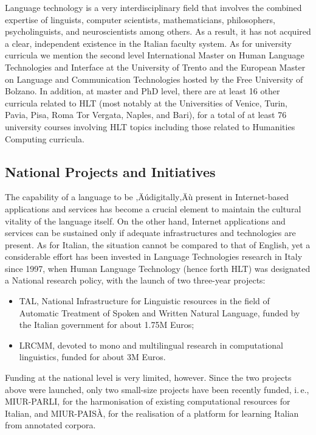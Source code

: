 \begin{multicols}{2}
Language technology is a very interdisciplinary field that involves
the combined expertise of linguists, computer scientists,
mathematicians, philosophers, psycholinguists, and neuroscientists
among others. As a result, it has not acquired a clear, independent
existence in the Italian faculty system. As for university curricula we mention the second level International Master
on Human Language Technologies and Interface at the University of Trento and
the European Master on Language and Communication Technologies hosted by the
Free University of Bolzano. In addition, at master and PhD level, there are at least 16 other curricula related
to HLT (most notably at the Universities of Venice, Turin, Pavia, Pisa, Roma
Tor Vergata, Naples, and Bari), for a total of at least 76 university
courses involving HLT topics including those related to Humanities Computing curricula.

\subsection{National Projects and Initiatives}

The capability of a language to be ‚Äúdigitally‚Äù present in Internet-based applications and services has become a crucial element to maintain the cultural vitality of the language itself. On the other hand, Internet applications and services can be sustained only if adequate infrastructures and technologies are present. As for Italian, the situation cannot be compared to that of English, yet a considerable effort has been invested in Language Technologies research in Italy since 1997, when Human Language Technology (hence forth HLT) was designated a National research policy, with the launch of two three-year projects:

\begin{itemize}
\item TAL, National Infrastructure for Linguistic resources in the field of Automatic Treatment of Spoken and Written Natural Language, funded by the Italian government for about 1.75M Euros;
\item LRCMM, devoted to mono and multilingual research in computational linguistics, funded for about 3M Euros.
\end{itemize}

Funding at the national level is very limited, however. Since the two
projects above were launched, only two small-size projects have been
recently funded, i.\,e., MIUR-PARLI, for the harmonisation of existing computational resources for Italian, and MIUR-PAIS\`{A}, for the realisation of a platform for learning Italian from annotated corpora.


\end{multicols}
